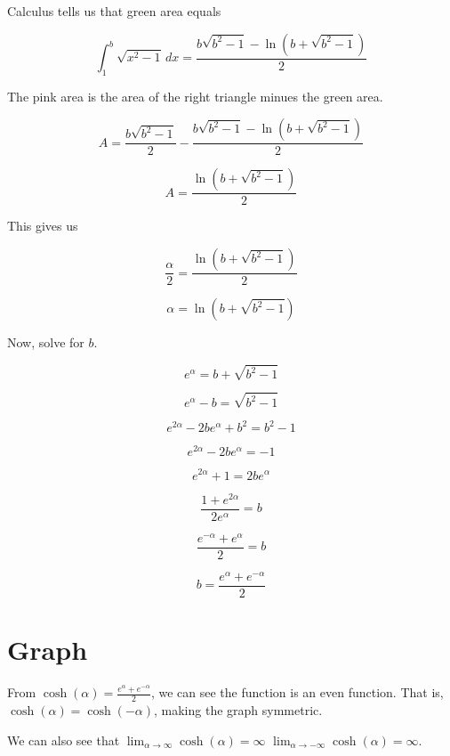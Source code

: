 \documentclass{ximera}
\begin{document}
Calculus tells us that green area equals


\[      \int_1^b \sqrt{x^2-1} \, dx = \frac{b \sqrt{b^2 - 1} - \ln(b + \sqrt{b^2 - 1})}{2}           \]


The pink area is the area of the right triangle minues the green area.



\[   A = \frac{b \sqrt{b^2 - 1}}{2} -     \frac{b \sqrt{b^2 - 1} - \ln(b + \sqrt{b^2 - 1})}{2}         \]



\[    A =    \frac{\ln(b + \sqrt{b^2 - 1})}{2}     \]


This gives us 



 \[    \frac{\alpha}{2} =    \frac{\ln(b + \sqrt{b^2 - 1})}{2}     \]




 \[    \alpha  =   \ln(b + \sqrt{b^2 - 1})  \]

Now, solve for $b$.




 \[    e^{\alpha}  =   b + \sqrt{b^2 - 1}  \]


 \[    e^{\alpha} - b =   \sqrt{b^2 - 1}  \]


 \[    e^{2\alpha} - 2 b e^{\alpha}  + b^2   =   b^2 - 1  \]


 \[    e^{2\alpha} - 2 b e^{\alpha}   =    - 1  \]


 \[    e^{2\alpha} +1  =   2 b e^{\alpha}     \]


 \[    \frac{ 1 + e^{2\alpha}}{2 e^{\alpha}}  =   b    \]


 \[    \frac{ e^{-\alpha} + e^{\alpha}}{2}  =   b    \]


 \[    b = \frac{ e^{\alpha} + e^{-\alpha}}{2}    \]





\section{Graph}





From  $\cosh(\alpha) = \frac{ e^{\alpha} + e^{-\alpha}}{2}$, we can see the function is an even function.  That is, $\cosh(\alpha) = \cosh(-\alpha)$, making the graph symmetric.



We can also see that $\lim_{\alpha \to \infty} \cosh(\alpha) = \infty$ $\lim_{\alpha \to -\infty} \cosh(\alpha) = \infty$.
\end{document}
